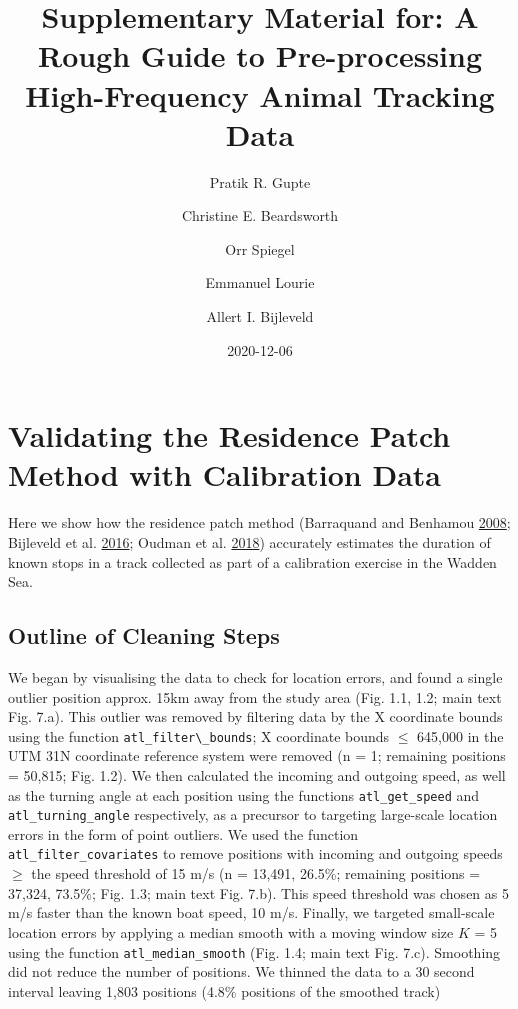 \documentclass[]{scrreprt}
\title{Supplementary Material for: A Rough Guide to Pre-processing High-Frequency Animal Tracking Data}
\author{Pratik R. Gupte \and Christine E. Beardsworth \and Orr Spiegel \and Emmanuel Lourie \and Allert I. Bijleveld}
\date{2020-12-06}
\begin{document}
\maketitle

{
\setcounter{tocdepth}{1}
\tableofcontents
}
\hypertarget{validating-the-residence-patch-method-with-calibration-data}{%
\chapter{Validating the Residence Patch Method with Calibration Data}\label{validating-the-residence-patch-method-with-calibration-data}}

Here we show how the residence patch method (Barraquand and Benhamou \protect\hyperlink{ref-barraquand2008}{2008}; Bijleveld et al. \protect\hyperlink{ref-bijleveld2016}{2016}; Oudman et al. \protect\hyperlink{ref-oudman2018}{2018}) accurately estimates the duration of known stops in a track collected as part of a calibration exercise in the Wadden Sea.

\hypertarget{outline-of-cleaning-steps}{%
\section{Outline of Cleaning Steps}\label{outline-of-cleaning-steps}}

We began by visualising the data to check for location errors, and found a single outlier position approx. 15km away from the study area (Fig. 1.1, 1.2; main text Fig. 7.a).
This outlier was removed by filtering data by the X coordinate bounds using the function \texttt{atl\_filter\textbackslash{}\_bounds}; X coordinate bounds \(\leq\) 645,000 in the UTM 31N coordinate reference system were removed (n = 1; remaining positions = 50,815; Fig. 1.2).
We then calculated the incoming and outgoing speed, as well as the turning angle at each position using the functions \texttt{atl\_get\_speed} and \texttt{atl\_turning\_angle} respectively, as a precursor to targeting large-scale location errors in the form of point outliers.
We used the function \texttt{atl\_filter\_covariates} to remove positions with incoming and outgoing speeds \(\geq\) the speed threshold of 15 m/s (n = 13,491, 26.5\%; remaining positions = 37,324, 73.5\%; Fig. 1.3; main text Fig. 7.b).
This speed threshold was chosen as 5 m/s faster than the known boat speed, 10 m/s.
Finally, we targeted small-scale location errors by applying a median smooth with a moving window size \(K\) = 5 using the function \texttt{atl\_median\_smooth} (Fig. 1.4; main text Fig. 7.c).
Smoothing did not reduce the number of positions.
We thinned the data to a 30 second interval leaving 1,803 positions (4.8\% positions of the smoothed track)
\end{document}
